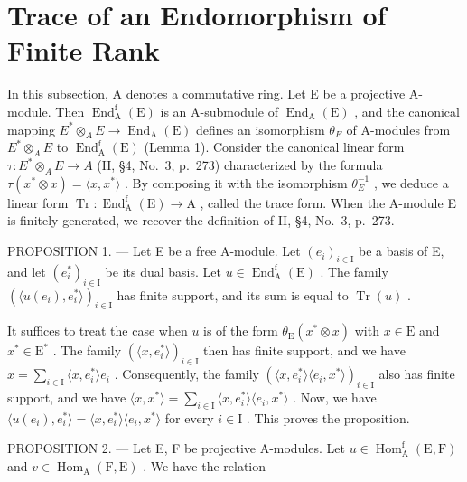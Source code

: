 \section{Trace of an Endomorphism of Finite Rank}

In this subsection, A denotes a commutative ring. Let E be a projective A-module. Then \(\operatorname{End}_{\mathrm{A}}^{\mathrm{f}}(\mathrm{E})\) is an A-submodule of \(\operatorname{End}_{\mathrm{A}}(\mathrm{E})\) , and the canonical mapping \(E^{*}\otimes_{A}E\to\operatorname{End}_{\mathrm{A}}(\mathrm{E})\) defines an isomorphism \(\theta_{E}\) of A-modules from \(E^{*}\otimes_{A}E\) to \(\operatorname{End}_{\mathrm{A}}^{\mathrm{f}}(\mathrm{E})\) (Lemma 1). Consider the canonical linear form \(\tau:E^{*}\otimes_{A}E\to A\) (II, §4, No.~3, p.~273) characterized by the formula \(\tau(x^{*}\otimes x)=\langle x,x^{*}\rangle\) . By composing it with the isomorphism \(\theta_{E}^{-1}\) , we deduce a linear form \(\operatorname{Tr}: \operatorname{End}_{\mathrm{A}}^{\mathrm{f}}(\mathrm{E})\to\mathrm{A}\) , called the trace form. When the A-module E is finitely generated, we recover the definition of II, §4, No.~3, p.~273.

PROPOSITION 1. --- Let E be a free A-module. Let \((e_{i})_{i\in\mathrm{I}}\) be a basis of E, and let \((e_{i}^{*})_{i\in\mathrm{I}}\) be its dual basis. Let \(u\in\operatorname{End}_{\mathrm{A}}^{\mathrm{f}}(\mathrm{E})\) . The family \((\langle u(e_{i}),e_{i}^{*}\rangle)_{i\in\mathrm{I}}\) has finite support, and its sum is equal to \(\operatorname{Tr}(u)\) .

It suffices to treat the case when \(u\) is of the form \(\theta_{\mathrm{E}}(x^{*} \otimes x)\) with \(x \in \mathrm{E}\) and \(x^{*} \in \mathrm{E}^{*}\) . The family \((\langle x, e_{i}^{*} \rangle)_{i \in \mathrm{I}}\) then has finite support, and we have \(x = \sum_{i \in \mathrm{I}} \langle x, e_{i}^{*} \rangle e_{i}\) . Consequently, the family \((\langle x, e_{i}^{*} \rangle \langle e_{i}, x^{*} \rangle)_{i \in \mathrm{I}}\) also has finite support, and we have \(\langle x, x^{*} \rangle = \sum_{i \in \mathrm{I}} \langle x, e_{i}^{*} \rangle \langle e_{i}, x^{*} \rangle\) . Now, we have \(\langle u(e_{i}), e_{i}^{*} \rangle = \langle x, e_{i}^{*} \rangle \langle e_{i}, x^{*} \rangle\) for every \(i \in \mathrm{I}\) . This proves the proposition.

PROPOSITION 2. --- Let E, F be projective A-modules. Let \(u \in \operatorname{Hom}_{\mathrm{A}}^{\mathrm{f}}(\mathrm{E}, \mathrm{F})\) and \(v \in \operatorname{Hom}_{\mathrm{A}}(\mathrm{F}, \mathrm{E})\) . We have the relation


